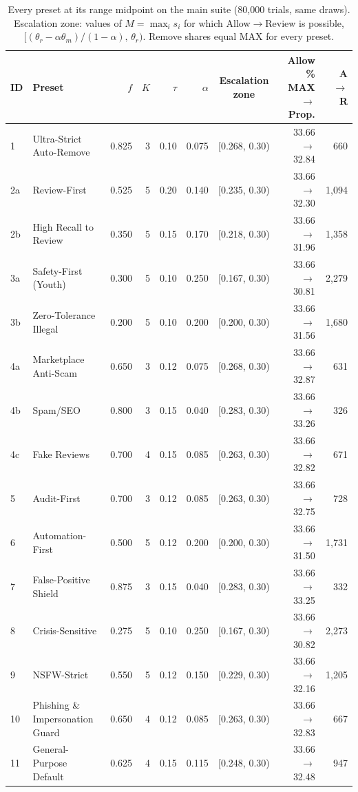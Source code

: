 \begin{table}[!t]
\caption{Every preset at its range midpoint on the main suite (80,000 trials, same draws).
Escalation zone: values of $M=\max_i s_i$ for which Allow$\to$Review is possible,
$[(\theta_r-\alpha\theta_m)/(1-\alpha),\,\theta_r)$. Remove shares equal MAX for every preset.}
\label{tab:preset-robustness}
\centering\footnotesize
\begin{tabular}{@{}llrrrrcrr@{}}
\toprule
\textbf{ID} & \textbf{Preset} & $f$ & $K$ & $\tau$ & $\alpha$ & \textbf{Escalation zone} & \textbf{Allow \% MAX$\to$Prop.} & \textbf{A$\to$R} \\
\midrule
1 & Ultra-Strict Auto-Remove & 0.825 & 3 & 0.10 & 0.075 & [0.268, 0.30) & 33.66 $\to$ 32.84 & 660 \\
2a & Review-First & 0.525 & 5 & 0.20 & 0.140 & [0.235, 0.30) & 33.66 $\to$ 32.30 & 1,094 \\
2b & High Recall to Review & 0.350 & 5 & 0.15 & 0.170 & [0.218, 0.30) & 33.66 $\to$ 31.96 & 1,358 \\
3a & Safety-First (Youth) & 0.300 & 5 & 0.10 & 0.250 & [0.167, 0.30) & 33.66 $\to$ 30.81 & 2,279 \\
3b & Zero-Tolerance Illegal & 0.200 & 5 & 0.10 & 0.200 & [0.200, 0.30) & 33.66 $\to$ 31.56 & 1,680 \\
4a & Marketplace Anti-Scam & 0.650 & 3 & 0.12 & 0.075 & [0.268, 0.30) & 33.66 $\to$ 32.87 & 631 \\
4b & Spam/SEO & 0.800 & 3 & 0.15 & 0.040 & [0.283, 0.30) & 33.66 $\to$ 33.26 & 326 \\
4c & Fake Reviews & 0.700 & 4 & 0.15 & 0.085 & [0.263, 0.30) & 33.66 $\to$ 32.82 & 671 \\
5 & Audit-First & 0.700 & 3 & 0.12 & 0.085 & [0.263, 0.30) & 33.66 $\to$ 32.75 & 728 \\
6 & Automation-First & 0.500 & 5 & 0.12 & 0.200 & [0.200, 0.30) & 33.66 $\to$ 31.50 & 1,731 \\
7 & False-Positive Shield & 0.875 & 3 & 0.15 & 0.040 & [0.283, 0.30) & 33.66 $\to$ 33.25 & 332 \\
8 & Crisis-Sensitive & 0.275 & 5 & 0.10 & 0.250 & [0.167, 0.30) & 33.66 $\to$ 30.82 & 2,273 \\
9 & NSFW-Strict & 0.550 & 5 & 0.12 & 0.150 & [0.229, 0.30) & 33.66 $\to$ 32.16 & 1,205 \\
10 & Phishing \& Impersonation Guard & 0.650 & 4 & 0.12 & 0.085 & [0.263, 0.30) & 33.66 $\to$ 32.83 & 667 \\
11 & General-Purpose Default & 0.625 & 4 & 0.15 & 0.115 & [0.248, 0.30) & 33.66 $\to$ 32.48 & 947 \\
\bottomrule
\end{tabular}
\end{table}
